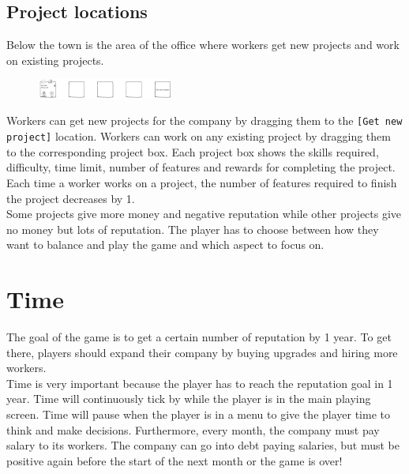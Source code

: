 \documentclass[11pt]{article}
\newcommand{\n}[0]{\\[\baselineskip]}
\begin{document}
\begin{multicols}{2}
\subsection{Project locations}
\noindent
Below the town is the area of the office where workers get new projects and work on existing projects. 
\begin{figure}[H]
\centering
\includegraphics[width=0.4\textwidth, keepaspectratio]{imgs/office.png}
\end{figure}
\noindent
Workers can get new projects for the company by dragging them to the \texttt{[Get new project]} location. Workers can work on any existing project by dragging them to the corresponding project box. Each project box shows the skills required, difficulty, time limit, number of features and rewards for completing the project. Each time a worker works on a project, the number of features required to finish the project decreases by 1. 
\n
Some projects give more money and negative reputation while other projects give no money but lots of reputation. The player has to choose between how they want to balance and play the game and which aspect to focus on.

\section{Time}
\noindent
The goal of the game is to get a certain number of reputation by 1 year. To get there, players should expand their company by buying upgrades and hiring more workers. 
\n
Time is very important because the player has to reach the reputation goal in 1 year. Time will continuously tick by while the player is in the main playing screen. Time will pause when the player is in a menu to give the player time to think and make decisions. Furthermore, every month, the company must pay salary to its workers. The company can go into debt paying salaries, but must be positive again before the start of the next month or the game is over!


\end{multicols}
\end{document}
